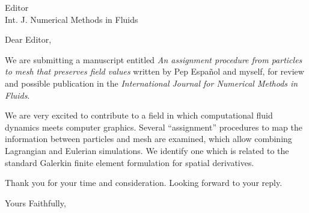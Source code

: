 \documentclass{letter}
\begin{document}
\begin{letter}{
    Editor \\
    Int. J. Numerical Methods in Fluids
}




\opening{Dear Editor,}

We are submitting a manuscript entitled \textit{%
An assignment procedure from particles to mesh that preserves
  field values} written by Pep Espa{\~n}ol
and myself, for review and possible publication in the
\textit{International Journal for Numerical Methods in Fluids}.

We are very excited to contribute to a field in which computational
fluid dynamics meets computer graphics.  Several ``assignment''
procedures to map the information between particles and mesh are
examined, which allow combining Lagrangian and Eulerian simulations. We
identify one which is related to the standard Galerkin finite element
formulation for spatial derivatives.

Thank you for your time and consideration. Looking forward to your
reply.

\closing{Yours Faithfully,}


\end{letter}
\end{document}
